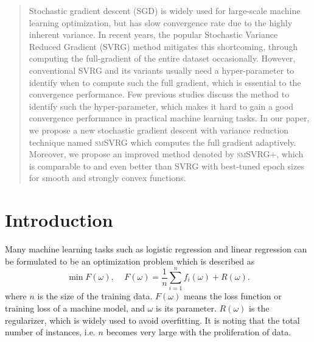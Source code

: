 \documentclass[conference]{IEEEtran}
\begin{document}

\maketitle

\begin{abstract}
    Stochastic gradient descent (SGD) is widely used for large-scale machine learning optimization, but has slow convergence rate due to the highly inherent variance. In recent years, the popular Stochastic Variance Reduced Gradient (SVRG) method mitigates this shortcoming, through computing the full-gradient of the entire dataset occasionally. However, conventional SVRG and its variants usually need a hyper-parameter to identify when to compute such the full gradient, which is essential to the convergence performance. Few previous studies discuss the method to identify such the hyper-parameter, which makes it hard to gain a good convergence performance in practical machine learning tasks.  In our paper, we propose a new stochastic gradient descent with variance reduction technique named \textsc{smSVRG} which computes the full gradient adaptively.  Moreover, we propose an improved method denoted by \textsc{smSVRG+}, which is comparable to and even better than SVRG with best-tuned epoch sizes for smooth and strongly convex functions.


\end{abstract}


%
\IEEEpeerreviewmaketitle



\section{Introduction}
Many machine learning tasks such as logistic regression and linear regression can be formulated to be an optimization problem which is described as 
\begin{equation}
\label{equation_loss_minimization}
\min F(\omega),~~~~~F(\omega)=\frac{1}{n}\sum\limits_{i=1}^n f_i(\omega)+R(\omega).
\end{equation}
where $n$ is the size of the training data. $F(\omega)$ means the loss function or training loss of a machine model, and $\omega$ is its parameter. $R(\omega)$ is the regularizer, which is widely used to avoid overfitting. It is noting that the total number of instances, i.e. $n$ becomes very large with the proliferation of data. 
\end{document}
